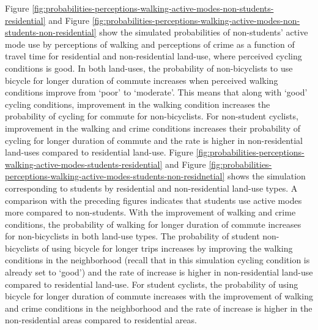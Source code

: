 \documentclass[]{elsarticle} %
\begin{document}
Figure
\ref{fig:probabilities-perceptions-walking-active-modes-non-students-residential}
and Figure
\ref{fig:probabilities-perceptions-walking-active-modes-non-students-non-residential}
show the simulated probabilities of non-students' active mode use by
perceptions of walking and perceptions of crime as a function of travel
time for residential and non-residential land-use, where perceived
cycling conditions is good. In both land-uses, the probability of
non-bicyclists to use bicycle for longer duration of commute increases
when perceived walking conditions improve from `poor' to `moderate'.
This means that along with `good' cycling conditions, improvement in the
walking condition increases the probability of cycling for commute for
non-bicyclists. For non-student cyclists, improvement in the walking and
crime conditions increases their probability of cycling for longer
duration of commute and the rate is higher in non-residential land-uses
compared to residential land-use. Figure
\ref{fig:probabilities-perceptions-walking-active-modes-students-residential}
and Figure
\ref{fig:probabilities-perceptions-walking-active-modes-students-non-residnetial}
shows the simulation corresponding to students by residential and
non-residential land-use types. A comparison with the preceding figures
indicates that students use active modes more compared to non-students.
With the improvement of walking and crime conditions, the probability of
walking for longer duration of commute increases for non-bicyclists in
both land-use types. The probability of student non-bicyclists of using
bicycle for longer trips increases by improving the walking conditions
in the neighborhood (recall that in this simulation cycling condition is
already set to `good') and the rate of increase is higher in
non-residential land-use compared to residential land-use. For student
cyclists, the probability of using bicycle for longer duration of
commute increases with the improvement of walking and crime conditions
in the neighborhood and the rate of increase is higher in the
non-residential areas compared to residential areas.
\end{document}
